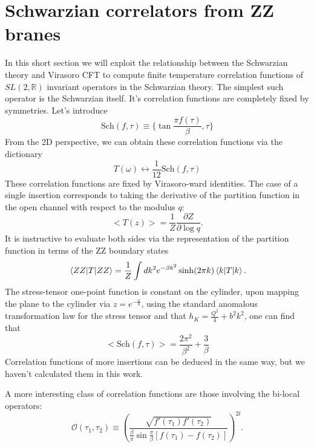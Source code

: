 \section{Schwarzian correlators from ZZ branes}
In this short section we will exploit the relationship between the Schwarzian theory and Virasoro CFT to compute finite temperature correlation functions of $SL(2,\mathbb{R})$ invariant operators in the Schwarzian theory. The simplest such operator is the Schwarzian itself. It's correlation functions are completely fixed by symmetries. Let's introduce
\begin{equation}
\text{Sch}(f,\tau) \equiv \{\tan\frac{\pi f(\tau)}{\beta},\tau\}
\end{equation}
From the 2D perspective, we can obtain these correlation functions via the dictionary
\begin{equation}
T(\omega)\leftrightarrow \frac{1}{12}\text{Sch}(f,\tau)
\end{equation}
These correlation functions are fixed by Virasoro-ward identities. The case of a single insertion corresponds to taking the derivative of the partition function in the open channel with respect to the modulus $q$:
\begin{equation}
<T(z)> = \frac{1}{Z}\frac{\partial Z}{\partial \log q}.
\end{equation}
It is instructive to evaluate both sides via the representation of the partition function in terms of the ZZ boundary states
\begin{equation}
\mel{ZZ}{T}{ZZ} = \frac{1}{Z}\int dk^2 e^{-\beta k^2}\sinh(2\pi k)\mel{k}{T}{k}.
\end{equation}
The stress-tensor one-point function is constant on the cylinder, upon mapping the plane to the cylinder via $z=e^{-\frac{\omega}{b}}$, using the standard anomalous transformation law for the stress tensor and that $h_K = \frac{Q^2}{4}+b^2k^2$, one can find that
\begin{equation}
<\text{Sch}(f,\tau)> = \frac{2\pi^2}{\beta^2} + \frac{3}{\beta}
\end{equation}
Correlation functions of more insertions can be deduced in the same way, but we haven't calculated them in this work.
\par 
A more interesting class of correlation functions are those involving the bi-local operators:
\begin{equation}
\mathcal{O}(\tau_1,\tau_2)\equiv\left(\frac{\sqrt{f'(\tau_1)f'(\tau_2)}}{\frac{\beta}{\pi}\sin\frac{\pi}{\beta}[f(\tau_1)-f(\tau_2)]}\right)^{2l}.
\label{eq:bylocal}
\end{equation}
